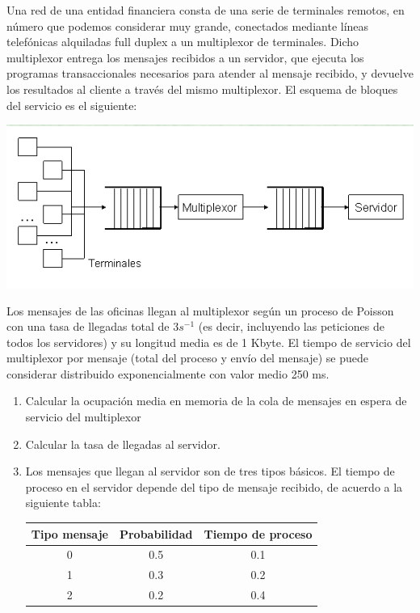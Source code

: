 
\begin{problem}[8]\label{tema2:prob8}
Una red de una entidad financiera consta de una serie de terminales remotos, en número que podemos considerar muy grande, conectados mediante líneas telefónicas alquiladas full duplex a un multiplexor de terminales. Dicho multiplexor entrega los mensajes recibidos a un servidor, que ejecuta los programas transaccionales necesarios para atender al mensaje recibido, y devuelve los resultados al cliente a través del mismo multiplexor. El esquema de bloques del servicio es el siguiente:

\begin{center}
  \includegraphics[keepaspectratio=true,width=\linewidth]{img/ej8.png}
\end{center}

Los mensajes de las oficinas llegan al multiplexor según un proceso de Poisson con una tasa de llegadas total de 3$s^{-1}$ (es decir, incluyendo las peticiones de todos los servidores) y su longitud media es de 1 Kbyte. El tiempo de servicio del multiplexor por mensaje (total del proceso y envío del mensaje) se puede considerar distribuido exponencialmente con valor medio 250 ms.

\begin{enumerate}
\item Calcular la ocupación media en memoria de la cola de mensajes en espera de servicio del multiplexor
\item Calcular la tasa de llegadas al servidor.
\item Los mensajes que llegan al servidor son de tres tipos básicos. El tiempo de proceso en el servidor depende del tipo de mensaje recibido, de acuerdo a la siguiente tabla:

\begin{center}
\begin{tabular}{| c | c | c |}
\hline
  \textbf{Tipo mensaje} &  \textbf{Probabilidad} & \textbf{Tiempo de proceso}\\
\hline
0 & 0.5 & 0.1 \\
1 & 0.3 & 0.2 \\
2 & 0.2 & 0.4 \\
\hline
\end{tabular}
\end{center}


\end{enumerate}
\end{problem}
